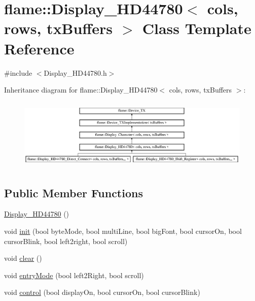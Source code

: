 \hypertarget{classflame_1_1_display___h_d44780}{\section{flame\-:\-:Display\-\_\-\-H\-D44780$<$ cols, rows, tx\-Buffers $>$ Class Template Reference}
\label{classflame_1_1_display___h_d44780}
}


{\ttfamily \#include $<$Display\-\_\-\-H\-D44780.\-h$>$}

Inheritance diagram for flame\-:\-:Display\-\_\-\-H\-D44780$<$ cols, rows, tx\-Buffers $>$\-:\begin{figure}[H]
\begin{center}
\leavevmode
\includegraphics[height=3.439803cm]{classflame_1_1_display___h_d44780}
\end{center}
\end{figure}
\subsection*{Public Member Functions}
\begin{DoxyCompactItemize}
\item 
\hyperlink{classflame_1_1_display___h_d44780_a90f5033f3b90d89e6846a610f9fb5c3e}{Display\-\_\-\-H\-D44780} ()
\item 
void \hyperlink{classflame_1_1_display___h_d44780_ad2482c6d54b96446b167f67b8db61443}{init} (bool byte\-Mode, bool multi\-Line, bool big\-Font, bool cursor\-On, bool cursor\-Blink, bool left2right, bool scroll)
\item 
void \hyperlink{classflame_1_1_display___h_d44780_aef98047f4e45787046eaf410f49313c2}{clear} ()
\item 
void \hyperlink{classflame_1_1_display___h_d44780_a3712476f8b040038ed1c31c3fcf8536a}{entry\-Mode} (bool left2\-Right, bool scroll)
\item 
void \hyperlink{classflame_1_1_display___h_d44780_a9ecdf0cf1754634a243f014170f61f32}{control} (bool display\-On, bool cursor\-On, bool cursor\-Blink)
\end{DoxyCompactItemize}
